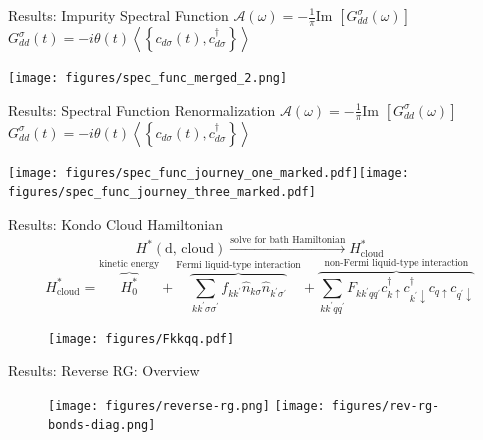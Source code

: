 \documentclass[aspectratio=169]{beamer}
\begin{document}
\begin{frame}{Results: Impurity Spectral Function}
	\(\mathcal{A(\omega)} = -\frac{1}{\pi}\text{Im }\left[G_{d d}^\sigma\left( \omega \right) \right]\) \hspace*{\fill} \(G_{d d}^\sigma\left(t\right) = -i\theta(t)\left<\left\{ c_{d\sigma}(t), c^\dagger_{d\sigma} \right\}\right>\)
\begin{center}
	\texttt{[image: figures/spec\_func\_merged\_2.png]}
\end{center}
\end{frame}

\begin{frame}{Results: Spectral Function Renormalization}
	\(\mathcal{A(\omega)} = -\frac{1}{\pi}\text{Im }\left[G_{d d}^\sigma\left( \omega \right) \right]\) \hspace*{\fill} \(G_{d d}^\sigma\left(t\right) = -i\theta(t)\left<\left\{ c_{d\sigma}(t), c^\dagger_{d\sigma} \right\}\right>\)
\begin{center}
	\texttt{[image: figures/spec\_func\_journey\_one\_marked.pdf]}\hspace*{\fill}\texttt{[image: figures/spec\_func\_journey\_three\_marked.pdf]}
\end{center}
\end{frame}

\begin{frame}{Results: Kondo Cloud Hamiltonian}
	\vspace*{-10pt}
	\[H^*(\text{d, cloud}) \xrightarrow{\text{solve for bath Hamiltonian}} H^*_\text{cloud}\] 
	\[H^*_\text{cloud} = \overbrace{H^*_0}^\text{kinetic energy} + \overbrace{\sum_{kk^\prime\sigma\sigma^\prime}f_{kk^\prime}\hat n_{k\sigma}\hat n_{k^\prime\sigma^\prime}}^\text{Fermi liquid-type interaction} + \overbrace{\sum_{kk^\prime qq^\prime}F_{kk^\prime qq^\prime}c^\dagger_{k \uparrow}c^\dagger_{k^\prime \downarrow} c_{q \uparrow}c_{q^\prime \downarrow}}^\text{non-Fermi liquid-type interaction}\]
\begin{figure}[htpb]
	\centering
	\texttt{[image: figures/Fkkqq.pdf]}
\end{figure}
\end{frame}

\begin{frame}{Results: Reverse RG: Overview}
	\vspace*{\fill}
	\begin{figure}[htpb]
		\centering
		\texttt{[image: figures/reverse-rg.png]}
		\hspace*{\fill}
		\texttt{[image: figures/rev-rg-bonds-diag.png]}
	\end{figure}
	\vspace*{\fill}
\end{frame}
\end{document}
